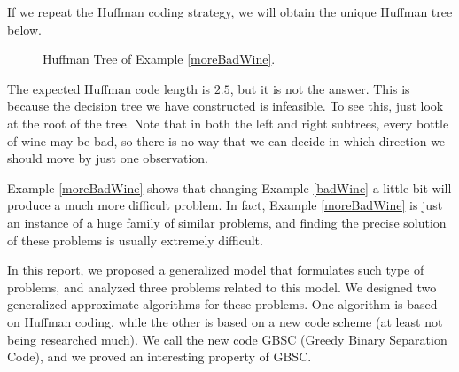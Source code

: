 If we repeat the Huffman coding strategy, we will obtain the unique Huffman tree below.

\begin{figure}[H]
    \centering
    \caption{Huffman Tree of Example \ref{moreBadWine}.}
\end{figure}

The expected Huffman code length is $2.5$, but it is not the answer. This is because the decision tree we have constructed is infeasible. To see this, just look at the root of the tree. Note that in both the left and right subtrees, every bottle of wine may be bad, so there is no way that we can decide in which direction we should move by just one observation.



Example \ref{moreBadWine} shows that changing Example \ref{badWine} a little bit will produce a much more difficult problem. In fact, Example \ref{moreBadWine} is just an instance of a huge family of similar problems, and finding the precise solution of these problems is usually extremely difficult.

In this report, we proposed a generalized model that formulates such type of problems, and analyzed three problems related to this model. We designed two generalized approximate algorithms for these problems. One algorithm is based on Huffman coding, while the other is based on a new code scheme (at least not being researched much). We call the new code GBSC (Greedy Binary Separation Code), and we proved an interesting property of GBSC.
